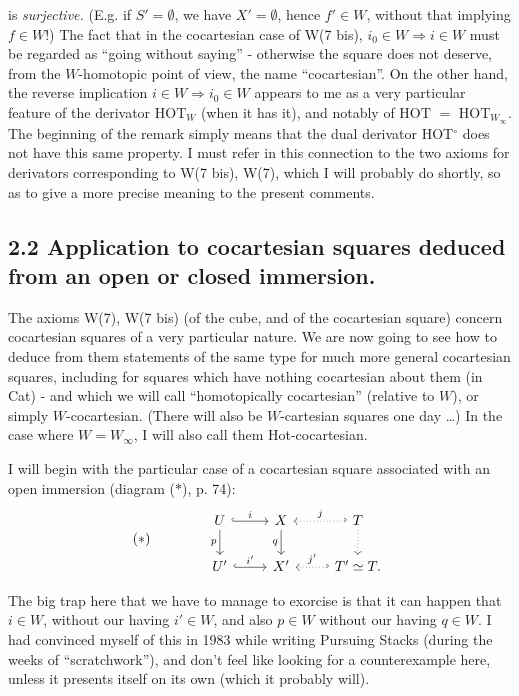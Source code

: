 
is \textit{surjective.} (E.g. if $S'=\emptyset$, we have $X'=\emptyset$, hence $f'\in W$, without that implying $f\in W$!) The fact that in the cocartesian case of W(7 bis), $i_0\in W\Longrightarrow i\in W$ must be regarded as ``going without saying'' - otherwise the square does not deserve, from the $W$-homotopic point of view, the name ``cocartesian''. On the other hand, the reverse implication $i\in W\Longrightarrow i_0\in W$ appears to me as a very particular feature of the derivator HOT$_W$ (when it has it), and notably %
of HOT $=$ HOT$_{W_\infty}$. The beginning
of the remark simply means that the dual derivator HOT$^\circ$ does not have this same property. I must refer in this connection to the two axioms for derivators corresponding to W(7 bis), W(7), which I will probably do shortly, so as to give a more precise meaning to the present comments.

\subsection*{2.2 Application to cocartesian squares deduced from an open or closed immersion.}

The axioms W(7), W(7 bis) (of the cube, and of the cocartesian square) concern cocartesian squares of a very particular nature. We are now going to see how to deduce from them statements of the same type for much more general cocartesian squares, including for squares which have nothing cocartesian about them (in Cat) - and which we will call %
``homotopically cocartesian'' (relative to $W$), or simply $W$-cocartesian. (There will also be $W$-cartesian squares one day \dots) In the case where $W=W_\infty$, I will also call them Hot-cocartesian. %

I will begin with the particular case of a cocartesian square associated with an open immersion (diagram ($*$), p. 74):
\[
(*)\qquad\qquad
\begin{tikzcd}
U \arrow[r, hook, "i"] \arrow[d, "p"'] & X \arrow[d, "q"'] & T \arrow[l, hook', dotted, "j"'] \arrow[d, dotted] \\
U' \arrow[r, hook, "i'"] & X' & T'\simeq T. \arrow[l, hook', dotted, "j'"']
\end{tikzcd}
\]

The big trap here that we have to manage to exorcise is that it can happen that $i\in W$, without our having $i'\in W$, and also $p\in W$ without our having $q\in W$. I had convinced myself of this in 1983 while writing Pursuing Stacks (during the weeks of ``scratchwork''), and don't feel like looking for a counterexample here, unless it presents itself on its own (which it probably will).

